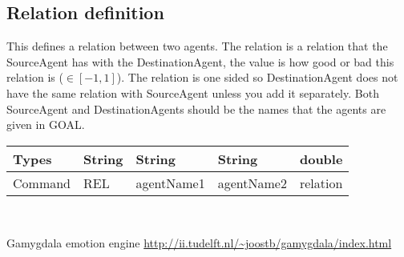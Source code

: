 \documentclass{scrartcl}
\begin{document}
\subsection{Relation definition}
This defines a relation between two agents. The relation is a relation that the SourceAgent has with the DestinationAgent, the value is how good or bad this relation is ($\in [-1,1]$). The relation is one sided so DestinationAgent does not have the same relation with SourceAgent unless you add it separately. Both SourceAgent and DestinationAgents should be the names that the agents are given in GOAL.\\
\begin{tabular}{|l|l|l|l|l|}
	\hline  Types& String & String & String & double\\ 
	\hline  Command & REL & agentName1 & agentName2 & relation \\ 
	\hline 
\end{tabular} 
\\
\pagebreak
\begin{thebibliography}{9}	
	Gamygdala emotion engine
	\url{http://ii.tudelft.nl/~joostb/gamygdala/index.html}
\end{thebibliography}

 
\end{document}
